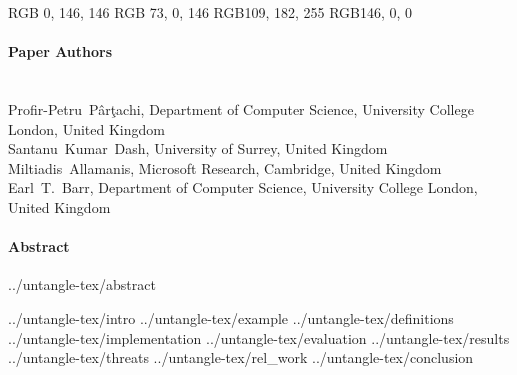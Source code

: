 \definecolor{cb-green-sea}  {RGB}{  0, 146, 146}
\definecolor{cb-purple}     {RGB}{ 73,   0, 146}
\definecolor{cb-blue-sky}   {RGB}{109, 182, 255}
\definecolor{cb-burgundy}   {RGB}{146,   0,   0}


\paragraph{Paper Authors}\\
Profir-Petru~P\^ar\c{t}achi, Department of Computer Science, University College London, United Kingdom\\
Santanu~Kumar~Dash, University of Surrey, United Kingdom\\
Miltiadis~Allamanis, Microsoft Research, Cambridge, United Kingdom\\
Earl~T.~Barr, Department of Computer Science, University College London, United Kingdom

\paragraph{Abstract}
{../untangle-tex/abstract}

{../untangle-tex/intro}
{../untangle-tex/example}
{../untangle-tex/definitions}
{../untangle-tex/implementation}
{../untangle-tex/evaluation}
{../untangle-tex/results}
{../untangle-tex/threats}
{../untangle-tex/rel_work}
{../untangle-tex/conclusion}